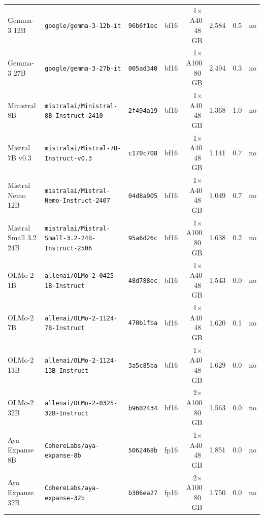 \begin{table}[t]
{\begin{tabular}{llllrrrl}
Gemma-3 12B & \texttt{google/gemma-3-12b-it} & \texttt{96b6f1ec} & bf16 & 1$\times$ A40 48\,GB & 2,584 & 0.5 & no \\
Gemma-3 27B & \texttt{google/gemma-3-27b-it} & \texttt{005ad340} & bf16 & 1$\times$ A100 80\,GB & 2,494 & 0.3 & no \\
Ministral 8B & \texttt{mistralai/Ministral-8B-Instruct-2410} & \texttt{2f494a19} & bf16 & 1$\times$ A40 48\,GB & 1,368 & 1.0 & no \\
Mistral 7B v0.3 & \texttt{mistralai/Mistral-7B-Instruct-v0.3} & \texttt{c170c708} & bf16 & 1$\times$ A40 48\,GB & 1,141 & 0.7 & no \\
Mistral Nemo 12B & \texttt{mistralai/Mistral-Nemo-Instruct-2407} & \texttt{04d8a905} & bf16 & 1$\times$ A40 48\,GB & 1,049 & 0.7 & no \\
Mistral Small 3.2 24B & \texttt{mistralai/Mistral-Small-3.2-24B-Instruct-2506} & \texttt{95a6d26c} & bf16 & 1$\times$ A100 80\,GB & 1,638 & 0.2 & no \\
OLMo-2 1B & \texttt{allenai/OLMo-2-0425-1B-Instruct} & \texttt{48d788ec} & bf16 & 1$\times$ A40 48\,GB & 1,543 & 0.0 & no \\
OLMo-2 7B & \texttt{allenai/OLMo-2-1124-7B-Instruct} & \texttt{470b1fba} & bf16 & 1$\times$ A40 48\,GB & 1,620 & 0.1 & no \\
OLMo-2 13B & \texttt{allenai/OLMo-2-1124-13B-Instruct} & \texttt{3a5c85ba} & bf16 & 1$\times$ A40 48\,GB & 1,629 & 0.0 & no \\
OLMo-2 32B & \texttt{allenai/OLMo-2-0325-32B-Instruct} & \texttt{b9602434} & bf16 & 2$\times$ A100 80\,GB & 1,563 & 0.0 & no \\
Aya Expanse 8B & \texttt{CohereLabs/aya-expanse-8b} & \texttt{5062468b} & fp16 & 1$\times$ A40 48\,GB & 1,851 & 0.0 & no \\
Aya Expanse 32B & \texttt{CohereLabs/aya-expanse-32b} & \texttt{b306ea27} & fp16 & 2$\times$ A100 80\,GB & 1,750 & 0.0 & no \\
\bottomrule
\end{tabular}}
\label{tab:model-families}
\end{table}
